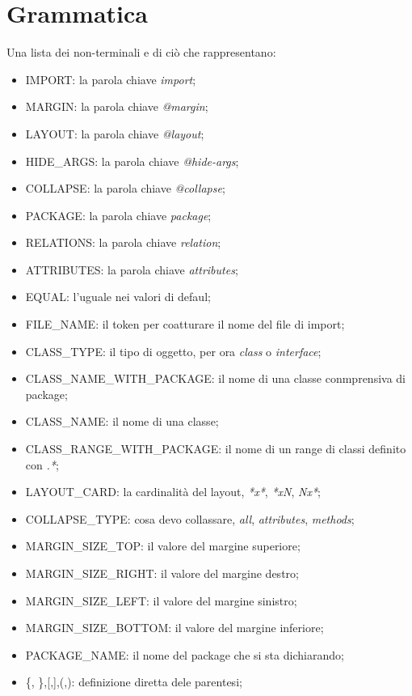 \section{Grammatica}

Una lista dei non-terminali e di ciò che rappresentano:

\begin{itemize}
\item IMPORT: la parola chiave \emph{import};
\item MARGIN: la parola chiave \emph{@margin};
\item LAYOUT: la parola chiave \emph{@layout};
\item HIDE{\_}ARGS: la parola chiave \emph{@hide-args};
\item COLLAPSE: la parola chiave \emph{@collapse}; 
\item PACKAGE: la parola chiave \emph{package}; 
\item RELATIONS:  la parola chiave \emph{relation}; 
\item ATTRIBUTES:  la parola chiave \emph{attributes};  
\item EQUAL: l'uguale nei valori di defaul;
\item FILE{\_}NAME: il token per coatturare il nome del file di import;
\item CLASS{\_}TYPE: il tipo di oggetto, per ora \emph{class} o \emph{interface};
\item CLASS{\_}NAME{\_}WITH{\_}PACKAGE: il nome di una classe conmprensiva di package;
\item CLASS{\_}NAME: il nome di una classe;
\item CLASS{\_}RANGE{\_}WITH{\_}PACKAGE: il nome di un range di classi definito
con \emph{.*};
\item LAYOUT{\_}CARD: la cardinalità del layout, \emph{*x*}, \emph{*xN}, \emph{Nx*};
\item COLLAPSE{\_}TYPE: cosa devo collassare, \emph{all}, \emph{attributes}, \emph{methods};
\item MARGIN{\_}SIZE{\_}TOP: il valore del margine superiore;
\item MARGIN{\_}SIZE{\_}RIGHT: il valore del margine destro;
\item MARGIN{\_}SIZE{\_}LEFT: il valore del margine sinistro;
\item MARGIN{\_}SIZE{\_}BOTTOM: il valore del margine inferiore;
\item PACKAGE{\_}NAME: il nome del package che si sta dichiarando; 
\item \{, \},[,],(,): definizione diretta dele parentesi;

\end{itemize}
